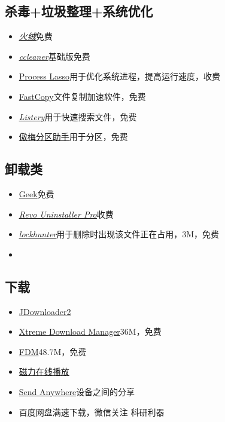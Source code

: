 \documentclass[UTF8,oneside]{ctexbook}
\begin{document}
\subsection{杀毒+垃圾整理+系统优化}
\begin{itemize}
	\item \underline{\textit{\href{https://www.huorong.cn}{火绒}}}\quad 免费
	\item \underline{\textit{\href{http://ccleaner.soft88.com}{ccleaner}}}\quad 基础版免费
	\item \href{https://bitsum.com}{Process Lasso}\quad 用于优化系统进程，提高运行速度，收费
	\item \href{https://fastcopy.jp/en/}{FastCopy}\quad 文件复制加速软件，免费
	\item \underline{\textit{\href{https://www.listary.com}{Listery}}}\quad 用于快速搜索文件，免费
	\item \href{http://www.disktool.cn/download.html}{傲梅分区助手}\quad 用于分区，免费
\end{itemize}

\subsection{卸载类}
\begin{itemize}
	\item \href{https://geekuninstaller.com}{Geek}\quad 免费
	\item \underline{\textit{\href{https://www.revouninstaller.com/}{Revo Uninstaller Pro}}}\quad 收费
	\item \underline{\textit{\href{https://lockhunter.com}{lockhunter}}}\quad 用于删除时出现该文件正在占用，3M，免费
	\item
\end{itemize}

\subsection{下载}
\begin{itemize}
	\item \href{http://jdownloader.org/jdownloader2}{JDownloader2}
	\item \href{http://xdman.sourceforge.net}{Xtreme Download Manager}\quad 36M，免费
	\item \href{https://www.freedownloadmanager.org/}{FDM}\quad 48.7M，免费
	\item \href{https://webtorrent.io}{磁力在线播放}
	\item \href{https://send-anywhere.com}{Send Anywhere}\quad 设备之间的分享
	\item 百度网盘满速下载，微信关注 科研利器
\end{itemize}
\end{document}
